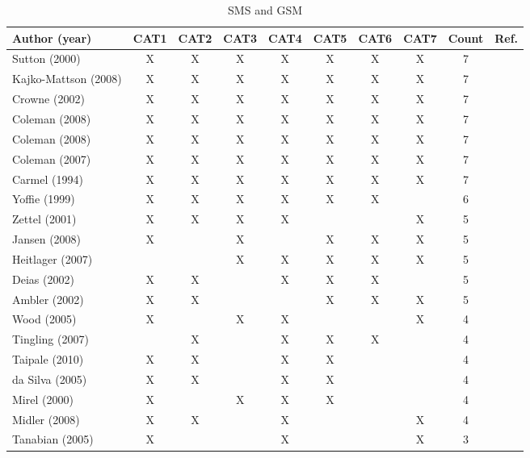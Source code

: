 \documentclass[10pt,journal,letterpaper,compsoc]{IEEEtran}
\begin{document}
\begin{table}[!t]
\renewcommand{\arraystretch}{1.3}
\caption{SMS \cite{SMS} and GSM} 
\label{tab:an:literature_comp}
\centering
\begin{tabular}{|l||c||c||c||c||c||c||c||c||c|}

\hline
Author (year) & CAT1 & CAT2 & CAT3 & CAT4 & CAT5 & CAT6 & CAT7 & Count & Ref. \\
\hline
Sutton (2000) & X & X & X & X & X & X & X & 7 & \cite{Sutton2000} \\
Kajko-Mattson (2008) & X & X & X & X & X & X & X & 7 & 
\cite{Kajko-Mattsson2008} \\
Crowne (2002) & X & X & X & X & X & X & X & 7 & \cite{Crowne2002} \\
Coleman (2008) & X & X & X & X & X & X & X & 7 & \cite{Coleman2008a} \\
Coleman (2008) & X & X & X & X & X & X & X & 7 & \cite{Coleman2008} \\
Coleman (2007) & X & X & X & X & X & X & X & 7 & \cite{Coleman2007} \\
Carmel (1994) & X & X & X & X & X & X & X & 7 & \cite{Camel1994a} \\
Yoffie (1999) & X & X & X & X & X & X & & 6 & \cite{Yoffie1999} \\
Zettel (2001) & X & X & X & X & & & X & 5 & \cite{Zettel2001} \\
Jansen (2008) & X & & X & & X & X & X & 5 & \cite{Jansen2008} \\
Heitlager (2007) &  &  & X & X & X & X & X & 5 & \cite{Heitlager2007} \\
Deias (2002) & X & X & & X & X & X & & 5 & \cite{Deias} \\
Ambler (2002) & X & X &  &  & X & X & X & 5 & \cite{Ambler2002} \\
Wood (2005) & X &  & X  & X &  &  & X & 4 & \cite{Wood2005} \\
Tingling (2007) &  & X &  & X & X & X &  & 4 & \cite{Tingling2007} \\
Taipale (2010) & X & X &  & X & X &  &  & 4 & \cite{Taipale2010} \\
da Silva (2005) & X & X &  & X & X &  &  & 4 & \cite{Silva2005} \\
Mirel (2000) & X &  & X & X & X &  &  & 4 & \cite{Mirel2000} \\
Midler (2008) & X & X &  & X &  &  & X & 4 & \cite{Midler2008} \\
Tanabian (2005) & X &  &  & X &  &  & X  & 3 & \cite{Tanabian2005} \\

\end{tabular}
\end{table}
\end{document}
